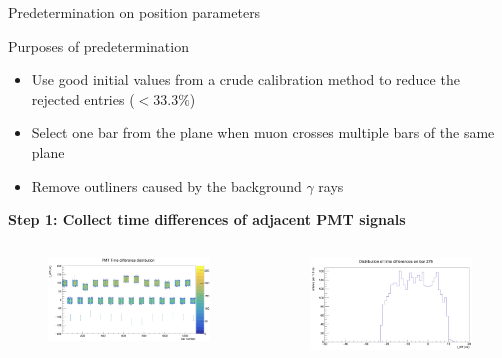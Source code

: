 \documentclass{ikpKoeln}
\begin{document}
\begin{frame}[t]{Predetermination on position parameters}
	\vspace*{-0.5em}
	\begin{exampleblock}{Purposes of predetermination}
		\begin{itemize}
			\item Use good initial values from a crude calibration method to reduce the rejected entries ($< 33.3\%$)
			\item Select one bar from the plane when muon crosses multiple bars of the same plane
			\item Remove outliners caused by the background $\gamma$ rays
		\end{itemize}
	\end{exampleblock}
	\textbf{\footnotesize Step 1: Collect time differences of adjacent PMT signals}
	\vspace*{-1.8em}
	\begin{columns}[t]
		\begin{column}[t]{0.48\textwidth}
			\begin{figure}[t]
				\vspace*{-1em}
				\centering
				\includegraphics[height = 0.47\textheight]{R3BCon2024GSI/total_tdiff.png}
			\end{figure}
		\end{column}
		\begin{column}[t]{0.48\textwidth}
			\begin{figure}[t]
				\centering
				\includegraphics[height = 0.48\textheight]{R3BCon2024GSI/one_bar_tdiff.png}
			\end{figure}
		\end{column}
	\end{columns}
\end{frame}
\end{document}
